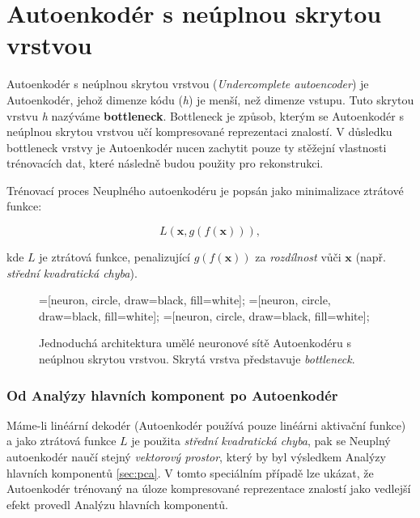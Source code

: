 \section{Autoenkodér s neúplnou skrytou vrstvou}
\label{sec:undercomplete_autoencoder}
Autoenkodér s neúplnou skrytou vrstvou (\emph{Undercomplete autoencoder}) je Autoenkodér, jehož dimenze kódu (\emph{h}) je menší, než dimenze vstupu.
Tuto skrytou vrstvu \emph{h} nazýváme \textbf{bottleneck}. Bottleneck je způsob, kterým se Autoenkodér s neúplnou skrytou vrstvou učí kompresované reprezentaci znalostí. 
V důsledku bottleneck vrstvy je Autoenkodér nucen zachytit pouze ty stěžejní vlastnosti trénovacích dat, které následně budou použity pro rekonstrukci.

Trénovací proces Neuplného autoenkodéru je popsán jako minimalizace ztrátové funkce:

\begin{equation}
    L(\mathbf{x}, g(f(\mathbf{x}))),
\end{equation}

kde $L$ je ztrátová funkce, penalizující $g(f(\mathbf{x}))$ za \emph{rozdílnost} vůči $\mathbf{x}$ (např. \emph{střední kvadratická chyba}).


\begin{figure}[H]
    \centering
    \begin{neuralnetwork}[height=4]
        =[neuron, circle, draw=black, fill=white];
        =[neuron, circle, draw=black, fill=white];
        =[neuron, circle, draw=black, fill=white];
      
      
      
        \hiddenlayer[count=2, bias=false, title=Kód $\emph{h}$]
        \linklayers
      
        \outputlayer[count=4, title=Dekodér, text=\xout]
        \linklayers
      
      \end{neuralnetwork}
    \caption{Jednoduchá architektura umělé neuronové sítě Autoenkodéru s neúplnou skrytou vrstvou. Skrytá vrstva představuje \emph{bottleneck}.}
    \label{fig:autoencoder_bottleneck}
\end{figure}
\subsubsection{Od Analýzy hlavních komponent po Autoenkodér}
Máme-li linéární dekodér (Autoenkodér používá pouze linéárni aktivační funkce) a jako ztrátová funkce $L$ je použita \emph{střední kvadratická chyba},
pak se Neuplný autoenkodér naučí stejný \emph{vektorový prostor}, který by byl výsledkem Analýzy hlavních komponentů \autoref{sec:pca}.
V tomto speciálním případě lze ukázat, že Autoenkodér trénovaný na úloze kompresované reprezentace znalostí jako vedlejší efekt provedl Analýzu hlavních komponentů.


